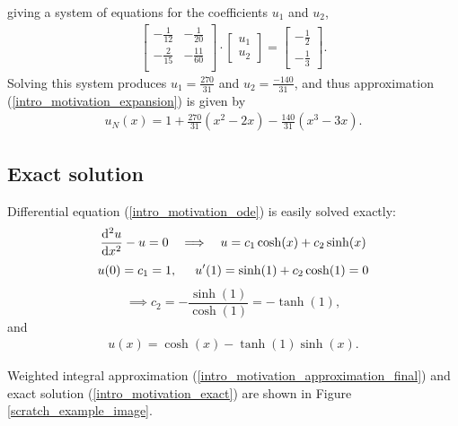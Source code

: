 giving a system of equations for the coefficients $u_1$ and $u_2$,
\begin{align*}
  \begin{bmatrix}
    - \frac{1}{12} & - \frac{1}{20} \\
    - \frac{2}{15} & - \frac{11}{60} \\
  \end{bmatrix} \cdot
  \begin{bmatrix}
    u_1 \\
    u_2
  \end{bmatrix} = 
  \begin{bmatrix}
    -\frac{1}{2} \\
    -\frac{1}{3}
  \end{bmatrix}.
\end{align*}
Solving this system produces $u_1 = \frac{270}{31}$ and $u_2 = \frac{-140}{31}$, and thus approximation (\ref{intro_motivation_expansion}) is given by
\begin{align}
  \label{intro_motivation_approximation_final}
  u_N(x) = 1 + \frac{270}{31} (x^2 - 2x) - \frac{140}{31} (x^3 - 3x).
\end{align}

\subsection{Exact solution}

Differential equation (\ref{intro_motivation_ode}) is easily solved exactly:
$$\totder[2]{u}{x} - u = 0 \hspace{2.5mm} \implies \hspace{2.5mm} u = c_1 \cosh(x) + c_2 \sinh(x)$$ 
$$u(0) = c_1 = 1, \hspace{5mm} u'(1) = \sinh(1) + c_2 \cosh(1) = 0$$
$$\implies c_2 = -\frac{\sinh(1)}{\cosh(1)} = -\tanh(1),$$
and 
\begin{align}
  \label{intro_motivation_exact}
  u(x) = \cosh(x) - \tanh(1)\sinh(x).
\end{align}

Weighted integral approximation (\ref{intro_motivation_approximation_final}) and exact solution (\ref{intro_motivation_exact}) are shown in Figure \ref{scratch_example_image}.


